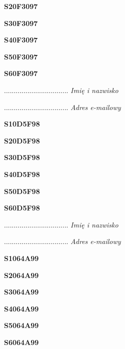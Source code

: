 \Large \textbf{S20F3097}

\Large \textbf{S30F3097}

\Large \textbf{S40F3097}

\Large \textbf{S50F3097}

\Large \textbf{S60F3097}

.................................
\textit{Imię i nazwisko}

.................................
\textit{Adres e-mailowy}

\Large \textbf{S10D5F98}

\Large \textbf{S20D5F98}

\Large \textbf{S30D5F98}

\Large \textbf{S40D5F98}

\Large \textbf{S50D5F98}

\Large \textbf{S60D5F98}

.................................
\textit{Imię i nazwisko}

.................................
\textit{Adres e-mailowy}

\Large \textbf{S1064A99}

\Large \textbf{S2064A99}

\Large \textbf{S3064A99}

\Large \textbf{S4064A99}

\Large \textbf{S5064A99}

\Large \textbf{S6064A99}